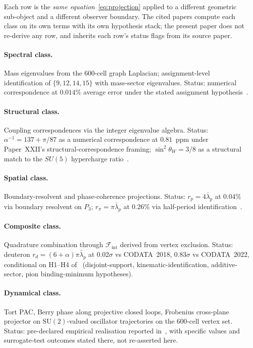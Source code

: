 \documentclass[12pt]{article}
\newcommand{\Fcal}{\mathcal{F}}
\begin{document}
Each row is the \emph{same equation}~\eqref{eq:projection} applied to a different geometric sub-object and a different observer boundary. The cited papers compute each class on its own terms with its own hypothesis stack; the present paper does not re-derive any row, and inherits each row's status flags from its source paper.

\paragraph{Spectral class.} Mass eigenvalues from the 600-cell graph Laplacian; assignment-level identification of $\{9, 12, 14, 15\}$ with mass-sector eigenvalues. Status: numerical correspondence at $0.014\%$ average error under the stated assignment hypothesis~\citep{SmartV}.

\paragraph{Structural class.} Coupling correspondences via the integer eigenvalue algebra. Status: $\alpha^{-1} = 137 + \pi/87$ as a numerical correspondence at $0.81$~ppm under Paper~XXII's structural-correspondence framing; $\sin^2 \theta_W = 3/8$ as a structural match to the $SU(5)$ hypercharge ratio~\citep{SmartXXII}.

\paragraph{Spatial class.} Boundary-resolvent and phase-coherence projections. Status: $r_p = 4 \bar\lambda_p$ at $0.04\%$ via boundary resolvent on $P_3$; $r_\pi = \pi \bar\lambda_p$ at $0.26\%$ via half-period identification~\citep{SmartXXXII}.

\paragraph{Composite class.} Quadrature combination through $\Fcal_{\text{int}}$ derived from vertex exclusion. Status: deuteron $r_d = (6 + \alpha) \pi \bar\lambda_p$ at $0.02\sigma$ vs CODATA~2018, $0.83\sigma$ vs CODATA~2022, conditional on H1--H4 of~\citep{SmartXXXII} (disjoint-support, kinematic-identification, additive-sector, pion binding-minimum hypotheses).

\paragraph{Dynamical class.} Tort PAC, Berry phase along projective closed loops, Frobenius cross-plane projector on $\mathrm{SU}(2)$-valued oscillator trajectories on the 600-cell vertex set. Status: pre-declared empirical realisation reported in~\citep{H4Coxeter2026}, with specific values and surrogate-test outcomes stated there, not re-asserted here.
\end{document}
